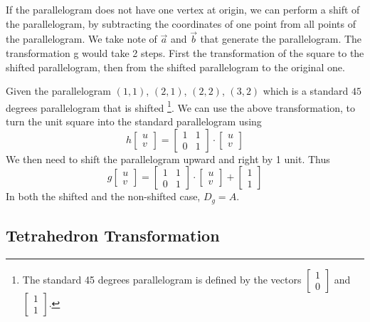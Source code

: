 If the parallelogram does not have one vertex at origin, we can perform a shift of the parallelogram, by subtracting the coordinates of one point from all points of the parallelogram. We take note of $\vec{a}$ and $\vec{b}$ that generate the  parallelogram. The transformation g would take 2 steps. First the transformation of the square to the shifted parallelogram, then from the shifted parallelogram to the original one.

\begin{example}
    Given the parallelogram $(1, 1)$, $(2, 1)$, $(2, 2)$, $(3, 2)$ which is a standard $45$ degrees parallelogram that is shifted \footnote{The standard 45 degrees parallelogram is defined by the vectors $\begin{bmatrix} 1 \\ 0 \end{bmatrix}$ and $\begin{bmatrix} 1 \\ 1 \end{bmatrix}$. }. We can use the above transformation, to turn the unit square into the standard parallelogram using $$h\begin{bmatrix} u \\ v \end{bmatrix} = \begin{bmatrix} 1 & 1 \\ 0 & 1 \end{bmatrix} \cdot \begin{bmatrix} u \\ v \end{bmatrix}$$  We then need to shift the parallelogram upward and right by 1 unit. Thus $$g\begin{bmatrix} u \\ v \end{bmatrix} = \begin{bmatrix} 1 & 1 \\ 0 & 1 \end{bmatrix} \cdot \begin{bmatrix} u \\ v \end{bmatrix} + \begin{bmatrix} 1 \\ 1 \end{bmatrix}$$ In both the shifted and the non-shifted case, $D_g = A$. 
\end{example}

\subsection*{Tetrahedron Transformation}


